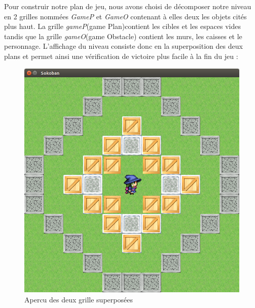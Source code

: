 \documentclass{article}
\begin{document}
			
Pour construir notre plan de jeu, nous avons choisi de décomposer notre niveau en 2 grilles nommées \textit{GameP} et \textit{GameO} contenant à elles deux les objets cités plus haut. La grille \textit{gameP}(game Plan)contient les cibles et les espaces vides tandis que la grille \textit{gameO}(game Obstacle) contient les murs, les caisses et le personnage. L'affichage du niveau consiste donc en la superposition des deux plans et permet ainsi une vérification de victoire plus facile à la fin du jeu : 
\begin{figure}[!h]
\centering
\includegraphics[scale=0.25]{img/05.png}
\caption{Apercu des deux grille superposées}
\end{figure}
\end{document}
